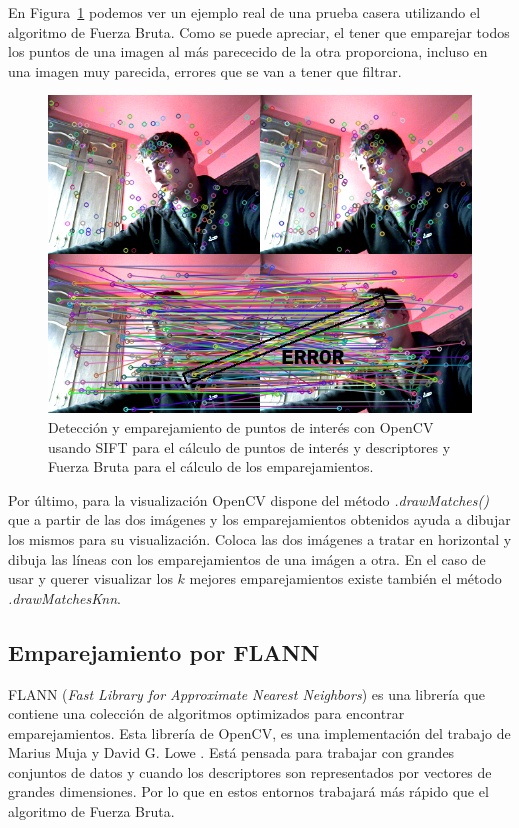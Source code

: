 En Figura~\ref{fig:SiftDetector} podemos ver un ejemplo real de una prueba casera utilizando el algoritmo de Fuerza Bruta. Como se puede apreciar, el tener que emparejar todos los puntos de una imagen al más parececido de la otra proporciona, incluso en una imagen muy parecida, errores que se van a tener que filtrar.

\begin{figure}[th]
\centering
\includegraphics[scale=0.8]{Figures/sift-detector.png}
\decoRule
\caption[Captura real con SIFT]{Detección y emparejamiento de puntos de interés con OpenCV usando SIFT para el cálculo de puntos de interés y descriptores y Fuerza Bruta para el cálculo de los emparejamientos.}
\label{fig:SiftDetector}
\end{figure}



Por último, para la visualización OpenCV dispone del método \textit{.drawMatches()} que a partir de las dos imágenes y los emparejamientos obtenidos ayuda a dibujar los mismos para su visualización. Coloca las dos imágenes a tratar en horizontal y dibuja las líneas con los emparejamientos de una imágen a otra. En el caso de usar y querer visualizar los $k$ mejores emparejamientos existe también el método \textit{.drawMatchesKnn}.


\subsection{Emparejamiento por FLANN}

FLANN (\textit{Fast Library for Approximate Nearest Neighbors}) es una librería que contiene una colección de algoritmos optimizados para encontrar emparejamientos. Esta librería de OpenCV, es una implementación del trabajo de Marius Muja y David G. Lowe \parencite{Reference11}. Está pensada para trabajar con grandes conjuntos de datos y cuando los descriptores son representados por vectores de grandes dimensiones. Por lo que en estos entornos trabajará más rápido que el algoritmo de Fuerza Bruta.

